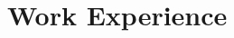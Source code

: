 \documentclass[a4paper,12pt]{article}
\begin{document}



\section*{Work Experience}
\vspace{2pt}
\end{document}
